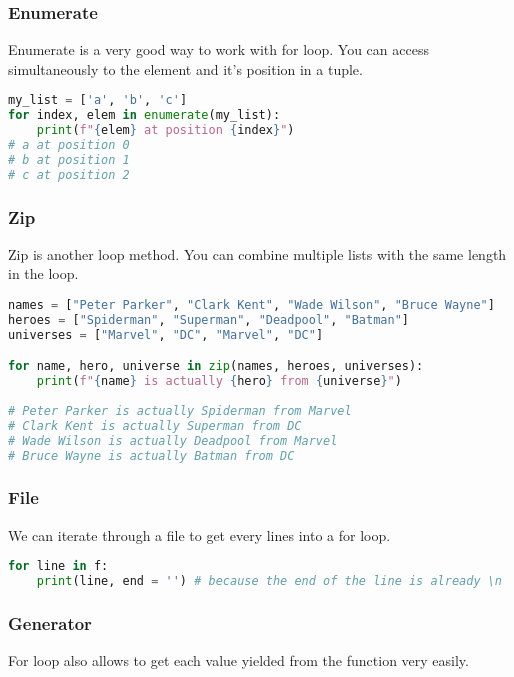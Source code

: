 \documentclass[a4paper, 12pt, titlepage]{scrartcl} %
\begin{document}
\subsubsection{Enumerate}
Enumerate is a very good way to work with for loop. You can access simultaneously to the element and it's position in a tuple.

\begin{lstlisting}[language=Python]
my_list = ['a', 'b', 'c']
for index, elem in enumerate(my_list):
	print(f"{elem} at position {index}")
# a at position 0
# b at position 1
# c at position 2
\end{lstlisting} \vspace{5mm}

\subsubsection{Zip}
Zip is another loop method. You can combine multiple lists with the same length in the loop.

\begin{lstlisting}[language=Python]
names = ["Peter Parker", "Clark Kent", "Wade Wilson", "Bruce Wayne"]
heroes = ["Spiderman", "Superman", "Deadpool", "Batman"]
universes = ["Marvel", "DC", "Marvel", "DC"]

for name, hero, universe in zip(names, heroes, universes):
	print(f"{name} is actually {hero} from {universe}")
	
# Peter Parker is actually Spiderman from Marvel
# Clark Kent is actually Superman from DC
# Wade Wilson is actually Deadpool from Marvel
# Bruce Wayne is actually Batman from DC
\end{lstlisting} \vspace{5mm}

\subsubsection{File}
We can iterate through a file to get every lines into a for loop.

\begin{lstlisting}[language=Python]
for line in f:
	print(line, end = '') # because the end of the line is already \n
\end{lstlisting} \vspace{5mm}

\subsubsection{Generator}
For loop also allows to get each value yielded from the function very easily.
\end{document}
